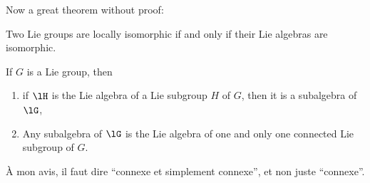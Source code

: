 Now a great theorem without proof:
\begin{theorem} \label{tho:loc_isom}
Two Lie groups are locally isomorphic if and only if their Lie algebras are isomorphic.
\end{theorem}

\begin{theorem}		\label{ThoSubGpSubAlg}		\label{tho:gp_alg}
If $G$ is a Lie group, then
\begin{enumerate}
\item\label{ThoSubGpSubAlgi} if $\lH$ is the Lie algebra of a Lie subgroup $H$ of $G$, then it is a subalgebra of $\lG$,
\item Any subalgebra of $\lG$ is the Lie algebra of one and only one connected Lie subgroup of $G$.
\end{enumerate}

\begin{probleme}
À mon avis, il faut dire ``connexe et simplement connexe'', et non juste ``connexe''.
\end{probleme}

\end{theorem}
